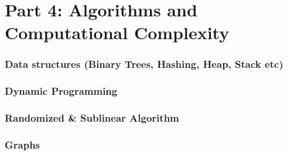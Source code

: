 \section{Part 4: Algorithms and Computational Complexity}

\begin{frame}
    \frametitle{Data structures (Binary Trees, Hashing, Heap, Stack etc)}
\end{frame}
\begin{frame}
    \frametitle{Dynamic Programming}
\end{frame}
\begin{frame}
    \frametitle{Randomized \& Sublinear Algorithm}
\end{frame}
\begin{frame}
    \frametitle{Graphs}
\end{frame}

